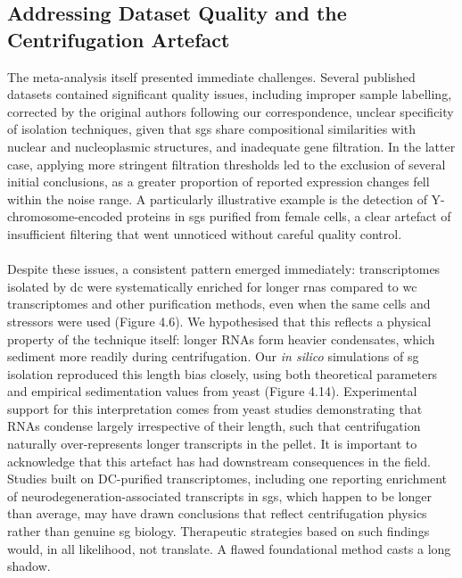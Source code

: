 \subsection{Addressing Dataset Quality and the Centrifugation Artefact}

The meta-analysis itself presented immediate challenges. Several published datasets contained significant quality issues, including improper sample labelling, corrected by the original authors following our correspondence\cite{matheny_rna_2021, matheny_corrigendum_2023}, unclear specificity of isolation techniques, given that \glspl{sg} share compositional similarities with nuclear and nucleoplasmic structures\cite{honda_high-depth_2021}, and inadequate gene filtration\cite{padron_proximity_2019, shen_sexually_2022}. In the latter case, applying more stringent filtration thresholds led to the exclusion of several initial conclusions, as a greater proportion of reported expression changes fell within the noise range\cite{padron_proximity_2019}. A particularly illustrative example is the detection of Y-chromosome-encoded proteins in \glspl{sg} purified from female cells\cite{padron_proximity_2019}, a clear artefact of insufficient filtering that went unnoticed without careful quality control.
\\
\\
Despite these issues, a consistent pattern emerged immediately: transcriptomes isolated by \gls{dc} were systematically enriched for longer \glspl{rna} compared to \gls{wc} transcriptomes and other purification methods, even when the same cells and stressors were used (Figure 4.6). We hypothesised that this reflects a physical property of the technique itself: longer RNAs form heavier condensates, which sediment more readily during centrifugation\cite{glauninger_transcriptome-wide_2025}. Our \textit{in silico} simulations of \gls{sg} isolation reproduced this length bias closely, using both theoretical parameters and empirical sedimentation values from yeast\cite{glauninger_transcriptome-wide_2025} (Figure 4.14). Experimental support for this interpretation comes from yeast studies demonstrating that RNAs condense largely irrespective of their length, such that centrifugation naturally over-represents longer transcripts in the pellet\cite{glauninger_transcriptome-wide_2025}.
It is important to acknowledge that this artefact has had downstream consequences in the field. Studies built on DC-purified transcriptomes, including one reporting enrichment of neurodegeneration-associated transcripts in \glspl{sg}, which happen to be longer than average\cite{sato_stress_2023}, may have drawn conclusions that reflect centrifugation physics rather than genuine \gls{sg} biology. Therapeutic strategies based on such findings would, in all likelihood, not translate. A flawed foundational method casts a long shadow.
